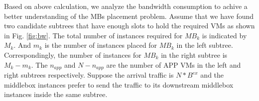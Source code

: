 \documentclass[review]{elsarticle}
\begin{document}

Based on above calculation, we analyze the bandwidth consumption to achive a better understanding of the MBs placement problem. Assume that we have found two candidate subtrees that have enough slots to hold the required VMs as shown in Fig. \ref{fig:bw}. The total number of instances required for $MB_k$ is indicated by $M_k$. And $m_k$ is the number of instances placed for $MB_k$  in the left subtree. %
 Correspondingly, the number of instances for $MB_k$ in the right subtree is $M_k-m_k$. The $n_{app}$ and $N-n_{app}$ are the number of APP VMs in the left and right subtrees respectively. Suppose the arrival traffic is $N*B^{ex}$ and the middlebox instances prefer to send the traffic to its downstream middlebox instances inside the same subtree.
\end{document}
